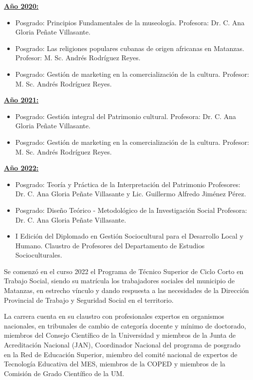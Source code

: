 \underline{\textbf{Año 2020:}}

\begin{itemize}
	\item Posgrado: Principios Fundamentales de la museología. Profesora: Dr. C. Ana Gloria Peñate Villasante.
	\item Posgrado: Las religiones populares cubanas de origen africanas en Matanzas. Profesor: M. Sc. Andrés Rodríguez Reyes.
	\item Posgrado: Gestión de marketing en la comercialización de la cultura. Profesor: M. Sc. Andrés Rodríguez Reyes. 
\end{itemize}

\underline{\textbf{Año 2021:}}

\begin{itemize}
	\item Posgrado: Gestión integral del Patrimonio cultural. Profesora: Dr. C. Ana Gloria Peñate Villasante.
	\item Posgrado: Gestión de marketing en la comercialización de la cultura. Profesor: M. Sc. Andrés Rodríguez Reyes.
\end{itemize}

\underline{\textbf{Año 2022:}}

\begin{itemize}
	\item Posgrado: Teoría y Práctica de la Interpretación del Patrimonio Profesores: Dr. C. Ana Gloria Peñate Villasante y Lic. Guillermo Alfredo Jiménez Pérez.
	\item Posgrado: Diseño Teórico - Metodológico de la Investigación Social Profesora: Dr. C. Ana Gloria Peñate Villasante.
	\item I Edición del Diplomado en Gestión Sociocultural para el Desarrollo Local y Humano. Claustro de Profesores del Departamento de Estudios Socioculturales.
\end{itemize}

Se comenzó en el curso 2022 el Programa de Técnico Superior de Ciclo Corto en Trabajo Social, siendo su matrícula los trabajadores sociales del municipio de Matanzas, en estrecho vínculo y dando respuesta a las necesidades de la Dirección Provincial de Trabajo y Seguridad Social en el territorio. 
 
La carrera cuenta en su claustro con profesionales expertos en organismos nacionales, en tribunales de cambio de categoría docente y mínimo de doctorado, miembros del Consejo Científico de la Universidad y miembros de la Junta de Acreditación Nacional (JAN), Coordinador Nacional del programa de posgrado en la Red de Educación Superior, miembro del comité nacional de expertos de Tecnología Educativa del MES, miembros de la COPED y miembros de la Comisión de Grado Científico de la UM. 

